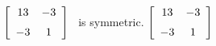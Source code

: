 {$\left[ \begin {array}{cc} 13&-3\\\noalign{\medskip}-3&1\end {array}
 \right]$} 
{\tta\ is symmetric. $\left[ \begin {array}{cc} 13&-3\\\noalign{\medskip}-3&1\end {array}
 \right]$}


  

